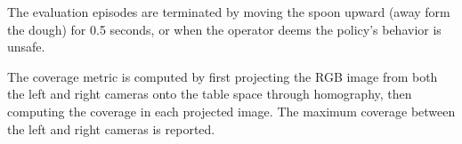 \documentclass[Afour,sageh,times]{sagej}
\begin{document}
The evaluation episodes are terminated by moving the spoon upward (away form the dough) for 0.5 seconds, or when the operator deems the policy's behavior is unsafe.

The coverage metric is computed by first projecting the RGB image from both the left and right cameras onto the table space through homography, then computing the coverage in each projected image. The maximum coverage between the left and right cameras is reported.


\end{document}
